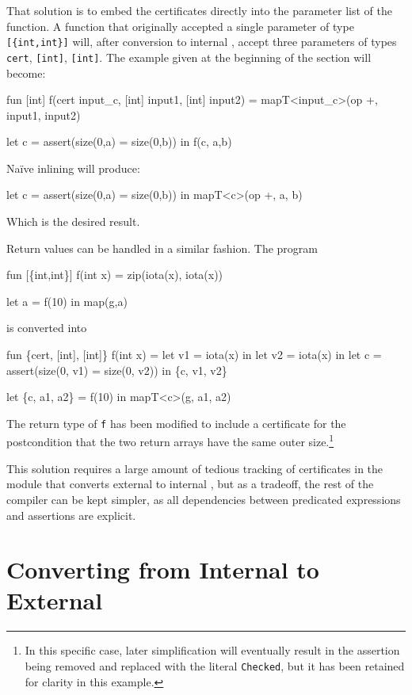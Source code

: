 That solution is to embed the certificates directly into the parameter
list of the function.  A function that originally accepted a single
parameter of type \texttt{[\{int,int\}]} will, after conversion to
internal \LO{}, accept three parameters of types \texttt{cert},
\texttt{[int]}, \texttt{[int]}.  The example given at the beginning of
the section will become:
\begin{colorcode}
fun [int] f(cert input_c, [int] input1, [int] input2) =
  mapT<input_c>(op +, input1, input2)

let c = assert(size(0,a) = size(0,b)) in
f(c, a,b)
\end{colorcode}
Naïve inlining will produce:
\begin{colorcode}
let c = assert(size(0,a) = size(0,b)) in
mapT<c>(op +, a, b)
\end{colorcode}
Which is the desired result.

Return values can be handled in a similar fashion.  The program
\begin{colorcode}
fun [\{int,int\}] f(int x) =
    zip(iota(x), iota(x))

let a = f(10) in
map(g,a)
\end{colorcode}
is converted into
\begin{colorcode}
fun \{cert, [int], [int]\} f(int x) =
  let v1 = iota(x) in
  let v2 = iota(x) in
  let c = assert(size(0, v1) = size(0, v2)) in
  \{c, v1, v2\}

let \{c, a1, a2\} = f(10) in
mapT<c>(g, a1, a2)
\end{colorcode}

The return type of \texttt{f} has been modified to include a
certificate for the postcondition that the two return arrays have the
same outer size.\footnote{In this specific case, later simplification
  will eventually result in the assertion being removed and replaced
  with the literal \texttt{Checked}, but it has been retained for
  clarity in this example.}

This solution requires a large amount of tedious tracking of
certificates in the module that converts external to internal \LO{},
but as a tradeoff, the rest of the compiler can be kept simpler, as
all dependencies between predicated expressions and assertions are
explicit.

\section{Converting from Internal to External \LO{}}
\label{sec:internal-to-external}

